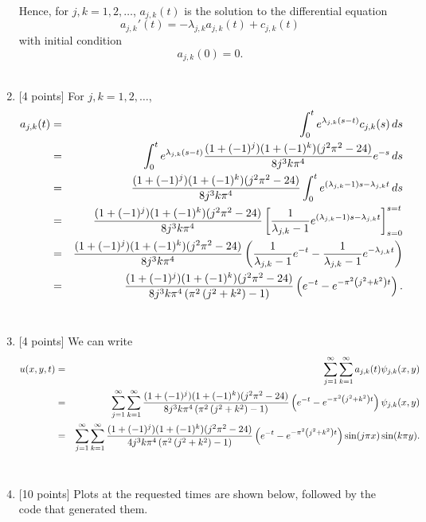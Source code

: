 \begin{solution}
\begin{enumerate}
Hence, for $j,k=1,2,\ldots$, $a_{j,k}(t)$ is the solution to the differential equation
\[
a_{j,k}'(t)=-\lambda_{j,k} a_{j,k}(t)+c_{j,k}(t)
\]
with initial condition
\[
a_{j,k}(0)=0.
\]
\\
\item {[4 points]} For $j,k=1,2,\ldots$,
\begin{eqnarray*}
a_{j,k}(t) &=& \int_0^t e^{\lambda_{j,k}\left(s-t\right)} c_{j,k}(s)\,ds
\\
&=& \int_0^t e^{\lambda_{j,k}\left(s-t\right)} {(1+(-1)^j)(1+(-1)^k) (j^2\pi^2-24)\over 8 j^3 k \pi^4} e^{-s}\,ds
\\
&=& {(1+(-1)^j)(1+(-1)^k) (j^2\pi^2-24)\over 8 j^3 k \pi^4} \int_0^t e^{\left(\lambda_{j,k}-1\right)s-\lambda_{j,k}t}\,ds
\\
&=& {(1+(-1)^j)(1+(-1)^k) (j^2\pi^2-24)\over 8 j^3 k \pi^4} \left[{1 \over \lambda_{j,k}-1}e^{\left(\lambda_{j,k}-1\right)s-\lambda_{j,k}t}\right]_{s=0}^{s=t}
\\
&=& {(1+(-1)^j)(1+(-1)^k) (j^2\pi^2-24)\over 8 j^3 k \pi^4} \left({1 \over \lambda_{j,k}-1}e^{-t}-{1 \over \lambda_{j,k}-1}e^{-\lambda_{j,k}t}\right)
\\
&=& {(1+(-1)^j)(1+(-1)^k) (j^2\pi^2-24)\over 8 j^3 k \pi^4\left(\pi^2\left(j^2+k^2\right)-1\right)} \left(e^{-t}-e^{-\pi^2\left(j^2+k^2\right)t}\right).
\end{eqnarray*}
\\
\item {[4 points]} We can write
\begin{eqnarray*}
u(x,y,t) &=& \sum_{j=1}^\infty \sum_{k=1}^\infty a_{j,k}(t) \psi_{j,k}(x,y)
\\
&=& \sum_{j=1}^\infty \sum_{k=1}^\infty {(1+(-1)^j)(1+(-1)^k) (j^2\pi^2-24)\over 8 j^3 k \pi^4\left(\pi^2\left(j^2+k^2\right)-1\right)} \left(e^{-t}-e^{-\pi^2\left(j^2+k^2\right)t}\right) \psi_{j,k}(x,y)
\\
&=& \sum_{j=1}^\infty \sum_{k=1}^\infty {(1+(-1)^j)(1+(-1)^k) (j^2\pi^2-24)\over 4 j^3 k \pi^4\left(\pi^2\left(j^2+k^2\right)-1\right)} \left(e^{-t}-e^{-\pi^2\left(j^2+k^2\right)t}\right) \sin(j\pi x)\sin(k\pi y).
\end{eqnarray*}
\\
\item {[10 points]} Plots at the requested times are shown below, followed by the code that
generated them.


\end{enumerate}
\end{solution}
